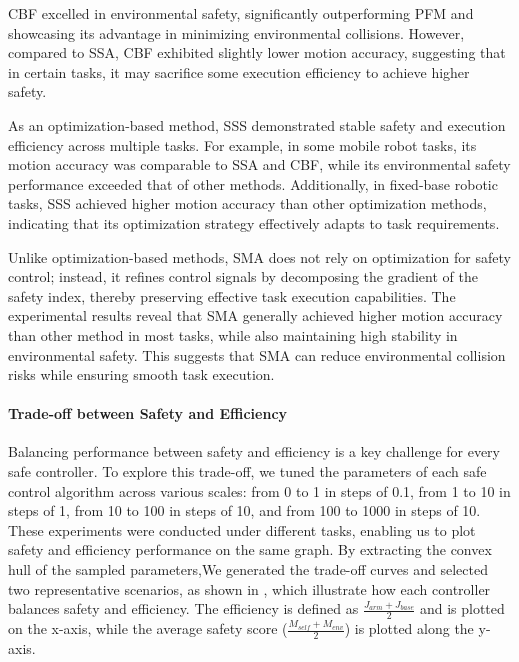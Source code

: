 CBF excelled in environmental safety, significantly outperforming PFM and showcasing its advantage in minimizing environmental collisions. However, compared to SSA, CBF exhibited slightly lower motion accuracy, suggesting that in certain tasks, it may sacrifice some execution efficiency to achieve higher safety.

As an optimization-based method, SSS demonstrated stable safety and execution efficiency across multiple tasks. For example, in some mobile robot tasks, its motion accuracy was comparable to SSA and CBF, while its environmental safety performance exceeded that of other methods. Additionally, in fixed-base robotic tasks, SSS achieved higher motion accuracy than other optimization methods, indicating that its optimization strategy effectively adapts to task requirements. 

Unlike optimization-based methods, SMA does not rely on optimization for safety control; instead, it refines control signals by decomposing the gradient of the safety index, thereby preserving effective task execution capabilities. The experimental results reveal that SMA generally achieved higher motion accuracy than other method in most tasks, while also maintaining high stability in environmental safety. This suggests that SMA can reduce environmental collision risks while ensuring smooth task execution.


% 

\paragraph{Trade-off between Safety and Efficiency}


Balancing performance between safety and efficiency is a key challenge for every safe controller. To explore this trade-off, we tuned the parameters of each safe control algorithm across various scales: from 0 to 1 in steps of 0.1, from 1 to 10 in steps of 1, from 10 to 100 in steps of 10, and from 100 to 1000 in steps of 10. These experiments were conducted under different tasks, enabling us to plot safety and efficiency performance on the same graph. By extracting the convex hull of the sampled parameters,We generated the trade-off curves and selected two representative scenarios, as shown in , which illustrate how each controller balances safety and efficiency.
The efficiency is defined as $\frac{J_{arm} + J_{base}}{2}$ and is plotted on the x-axis, while the average safety score ($\frac{M_{self}+ M_{env}}{2}$) is plotted along the y-axis.


